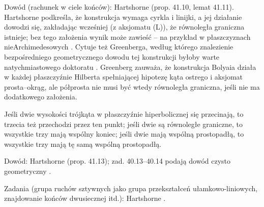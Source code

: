 Dowód (rachunek w ciele końców): Hartshorne \cite[s. 396--398]{hartshorne_2000} (prop. 41.10, lemat 41.11). %
Hartshorne podkreśla, że konstrukcja wymaga cyrkla i linijki, a jej działanie dowodzi się, zakładając wcześniej (z aksjomatu (L)), że równoległa graniczna istnieje; bez tego założenia wynik może zawieść -- na przykład w płaszczyznach nieArchimedesowych \cite[s. 398]{hartshorne_2000}. %
Cytuje też Greenberga, według którego znalezienie bezpośredniego geometrycznego dowodu tej konstrukcji byłoby warte natychmiastowego doktoratu \cite[s. 398]{hartshorne_2000}. %
Greenberg \cite[s. 210]{greenberg_2010} zauważa, że konstrukcja Bolyaia działa w każdej płaszczyźnie Hilberta spełniającej hipotezę kąta ostrego i aksjomat prosta--okrąg, ale półprosta nie musi być wtedy równoległa graniczna, jeśli nie ma dodatkowego założenia. %

\begin{theorem}
	Jeśli dwie wysokości trójkąta w płaszczyźnie hiperbolicznej się przecinają, to trzecia też przechodzi przez ten punkt; jeśli dwie są równoległe graniczne, to wszystkie trzy mają wspólny koniec; jeśli dwie mają wspólną prostopadłą, to wszystkie trzy mają tę samą wspólną prostopadłą. %
\end{theorem}

Dowód: Hartshorne \cite[s. 399--400]{hartshorne_2000} (prop. 41.13); zad. 40.13--40.14 podają dowód czysto geometryczny \cite[s. 387]{hartshorne_2000}. %

Zadania (grupa ruchów sztywnych jako grupa przekształceń ułamkowo-liniowych, znajdowanie końców dwusiecznej itd.): Hartshorne \cite[s. 400--402]{hartshorne_2000}. %


